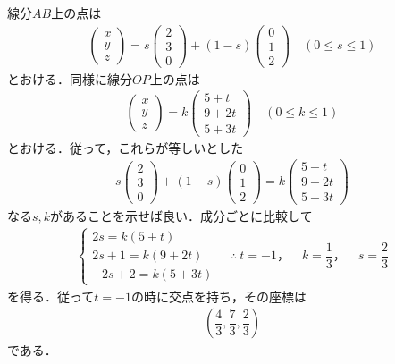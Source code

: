 \documentclass[../../main.tex]{subfiles}
\begin{document}
線分$AB$上の点は
\begin{align}
  \begin{pmatrix}x\\y\\z
  \end{pmatrix}=s
  \begin{pmatrix}2\\3\\0
  \end{pmatrix}+(1-s)
  \begin{pmatrix}0\\1\\2
  \end{pmatrix}\quad(0\le s\le1) \label{eq:1}
\end{align}
とおける．同様に線分$OP$上の点は
\begin{align}
  \begin{pmatrix}x\\y\\z
  \end{pmatrix}= k
  \begin{pmatrix}5+t\\9+2t\\5+3t
  \end{pmatrix}\quad(0\le k\le1) \label{eq:2}
\end{align}
とおける．従って，これらが等しいとした
\begin{align}
  s
  \begin{pmatrix}2\\3\\0
  \end{pmatrix}+(1-s)
  \begin{pmatrix}0\\1\\2
  \end{pmatrix}=k
  \begin{pmatrix}5+t\\9+2t\\5+3t
  \end{pmatrix}
\end{align}
なる$s,k$があることを示せば良い．成分ごとに比較して
\begin{align}
  \begin{cases}
    2s=k(5+t)\\
    2s+1=k(9+2t)\\
    -2s+2=k(5+3t)
  \end{cases}
  \quad\therefore\ t=-1，\quad k=\dfrac{1}{3}，\quad s=\dfrac{2}{3}
\end{align}
を得る．従って$t=-1$の時に交点を持ち，その座標は
\begin{align}
  \left(\dfrac{4}{3},\dfrac{7}{3},\dfrac{2}{3}\right)
\end{align}
である．

\newpage
\end{document}
